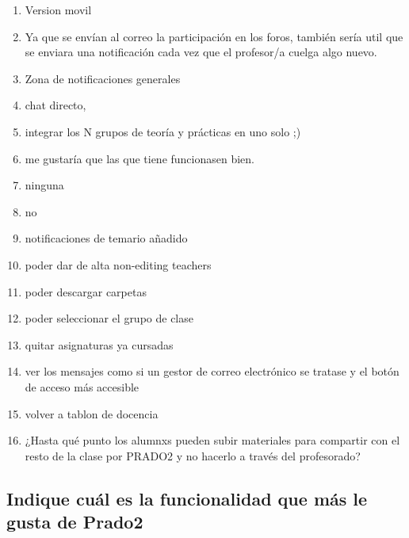 \begin{enumerate}
\item Version movil
\item Ya que se envían al correo la participación en los foros, también sería util que se enviara una notificación cada vez que el profesor/a cuelga algo nuevo.
\item Zona de notificaciones generales
\item chat directo,
\item integrar los N grupos de teoría y prácticas en uno solo ;)
\item me gustaría que las que tiene funcionasen bien.
\item ninguna
\item no
\item notificaciones de temario añadido
\item poder dar de alta non-editing teachers
\item poder descargar carpetas
\item poder seleccionar el grupo de clase
\item quitar asignaturas ya cursadas
\item ver los mensajes como si un gestor de correo electrónico se tratase y el botón de acceso más accesible
\item volver a tablon de docencia
\item ¿Hasta qué punto los alumnxs pueden subir materiales para compartir con el resto de la clase por PRADO2 y no hacerlo a través del profesorado?
\end{enumerate}

\subsection{Indique cuál es la funcionalidad que más le gusta de Prado2}
	
